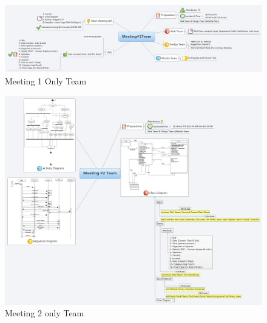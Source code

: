 \documentclass[12pt,a4paper,class,twoside,openany]{report}
\begin{document}
\begin{figure}
\begin{center}
\includegraphics[angle=90, width=2.40 in,height=8 in]{2-9}
\caption{Meeting 1 Only Team}
\label{fg:2-9}
\end{center}
\end{figure}
\begin{figure}
\begin{center}
\includegraphics[angle=90, width=5 in]{2-10}
\caption{Meeting 2 only Team}
\label{fg:2-10}
\end{center}
\end{figure}
\end{document}
